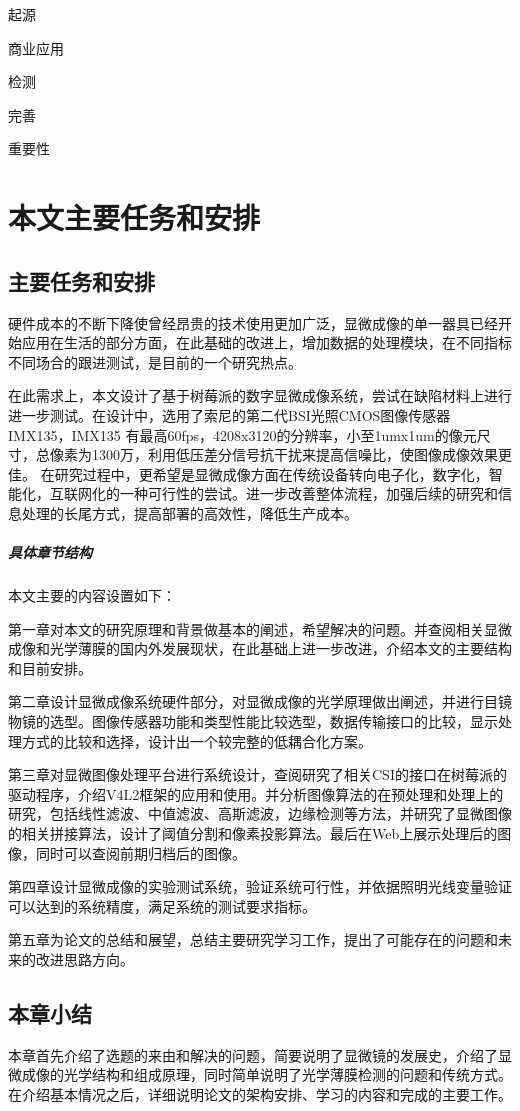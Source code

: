 起源

商业应用

检测

完善

重要性

\section{本文主要任务和安排}
\subsection{主要任务和安排}
硬件成本的不断下降使曾经昂贵的技术使用更加广泛，显微成像的单一器具已经开始应用在生活的部分方面，在此基础的改进上，增加数据的处理模块，在不同指标不同场合的跟进测试，是目前的一个研究热点。

在此需求上，本文设计了基于树莓派的数字显微成像系统，尝试在缺陷材料上进行进一步测试。在设计中，选用了索尼的第二代BSI光照CMOS图像传感器IMX135，IMX135 有最高60fps，4208x3120的分辨率，小至1umx1um的像元尺寸，总像素为1300万，利用低压差分信号抗干扰来提高信噪比，使图像成像效果更佳。
在研究过程中，更希望是显微成像方面在传统设备转向电子化，数字化，智能化，互联网化的一种可行性的尝试。进一步改善整体流程，加强后续的研究和信息处理的长尾方式，提高部署的高效性，降低生产成本。

	
\subparagraph{具体章节结构}
本文主要的内容设置如下：

第一章对本文的研究原理和背景做基本的阐述，希望解决的问题。并查阅相关显微成像和光学薄膜的国内外发展现状，在此基础上进一步改进，介绍本文的主要结构和目前安排。

第二章设计显微成像系统硬件部分，对显微成像的光学原理做出阐述，并进行目镜物镜的选型。图像传感器功能和类型性能比较选型，数据传输接口的比较，显示处理方式的比较和选择，设计出一个较完整的低耦合化方案。

第三章对显微图像处理平台进行系统设计，查阅研究了相关CSI的接口在树莓派的驱动程序，介绍V4L2框架的应用和使用。并分析图像算法的在预处理和处理上的研究，包括线性滤波、中值滤波、高斯滤波，边缘检测等方法，并研究了显微图像的相关拼接算法，设计了阈值分割和像素投影算法。最后在Web上展示处理后的图像，同时可以查阅前期归档后的图像。

第四章设计显微成像的实验测试系统，验证系统可行性，并依据照明光线变量验证可以达到的系统精度，满足系统的测试要求指标。

第五章为论文的总结和展望，总结主要研究学习工作，提出了可能存在的问题和未来的改进思路方向。


\subsection{本章小结}
本章首先介绍了选题的来由和解决的问题，简要说明了显微镜的发展史，介绍了显微成像的光学结构和组成原理，同时简单说明了光学薄膜检测的问题和传统方式。在介绍基本情况之后，详细说明论文的架构安排、学习的内容和完成的主要工作。
